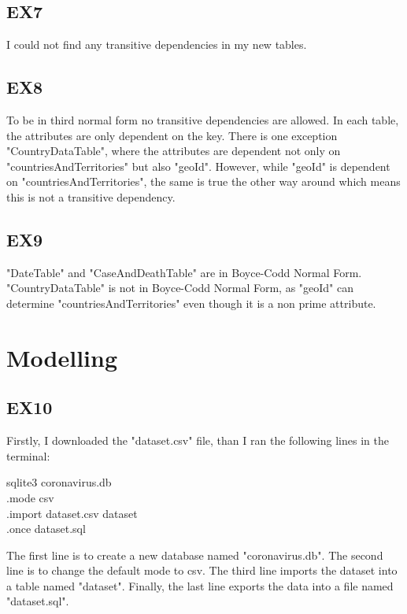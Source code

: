 \documentclass{article}
\begin{document}
\subsection{EX7}
I could not find any transitive dependencies in my new tables.

\subsection{EX8}
To be in third normal form no transitive dependencies are allowed. In each table, the attributes are only dependent on the key. There is one exception "CountryDataTable", where the attributes are dependent not only on "countriesAndTerritories" but also "geoId". However, while "geoId" is dependent on "countriesAndTerritories", the same is true the other way around which means this is not a transitive dependency. 

\subsection{EX9}
"DateTable" and "CaseAndDeathTable" are in Boyce-Codd Normal Form. "CountryDataTable" is not in Boyce-Codd Normal Form, as "geoId" can determine "countriesAndTerritories" even though it is a non prime attribute.

\section{Modelling}
\subsection{EX10}
Firstly, I downloaded the "dataset.csv" file, than I ran the following lines in the terminal:
\begin{algorithm}
sqlite3 coronavirus.db \\
.mode csv \\
.import dataset.csv dataset \\
.once dataset.sql
\end{algorithm} \par
The first line is to create a new database named "coronavirus.db". The second line is to change the default mode to csv. The third line imports the dataset into a table named "dataset". Finally, the last line exports the data into a file named "dataset.sql".
\end{document}
